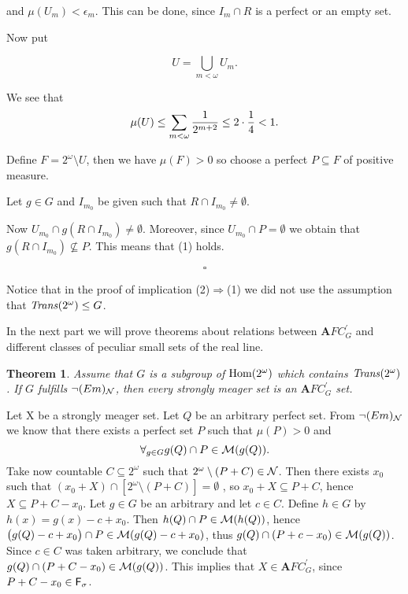\documentclass[b5cutpaper, twoside, 11pt, leqno]{moravica}
\newcommand{\eps}{\epsilon}
\newcommand{\afcp}{{\mathbf AFC}^\prime}
\newcommand\afcg{\afcp_{G}}
\newcommand\trans{{\it Trans}(\ca)}
\newcommand{\seq}{\subseteq}
\newcommand{\ca}{2^{\omega}}
\newcommand{\mgr}{{\cal M}}
\newcommand{\neglig}{{\cal N}}
\newcommand{\fsigma}{{\sf F}_{\sigma}}
\newcommand{\cantor}{\ca}
\newcommand\Hom{{\rm Hom(\ca)}}
\newtheorem{theorem}{Theorem}[section]
\theoremstyle{definition}
\begin{document}
and $\mu(U_{m}) < \eps_{m}$.
This can be done, since
$I_m \cap R$ is a perfect or an empty set.

Now put

\[ U = \bigcup_{m < \omega} U_m. \]

We see that
\[
\mu(U) \leq \sum_{m < \omega}
{1 \over 2^{m + 2}} \leq 2 \cdot {1 \over 4} < 1.
\]

Define $F = \cantor \setminus U$, then we have
$\mu(F) > 0$
so choose a perfect $P \seq F$ of positive
measure.

  Let $g \in G$ and $I_{m_0}$ be given such that
$R \cap I_{m_0} \not = \emptyset$.

Now $U_{m_0} \cap g(R \cap I_{m_0}) \not = \emptyset$.
Moreover, since
$U_{m_0} \cap P = \emptyset$
we obtain that $g(R \cap I_{m_0}) \not \seq P$.
This means that (1) holds.

  \[ \square \]

Notice that in the proof of implication (2)$\Rightarrow$(1)
we did not use the assumption that
$\trans \leq G$.

\bigskip

  In the next part we will prove theorems about relations between
$\afcg$ and different classes of peculiar small sets of the real line.

\begin{theorem}
\label{-em=>N}
  Assume that $G$ is a subgroup
of $\Hom$ which contains $\trans$.
  If $G$ fulfills $\neg (Em)_{\neglig}$,
then every strongly meager set is an $\afcg$ set.
\end{theorem}

\proof

Let X be a strongly meager set.
Let $Q$ be an arbitrary perfect set.
From $\neg (Em)_{\neglig}$ we know that there exists a perfect
set $P$ such that $\mu (P) > 0$ and
  \[ \forall_{g \in G} g(Q) \cap P \in \mgr(g(Q)). \]
Take now countable $C \seq \cantor $ such that
$\cantor \setminus (P + C) \in \neglig$.
  Then there exists $x_0$ such that $(x_0 +X) \cap
[ \cantor \setminus (P + C) ] = \emptyset $ ,
so $x_0 + X \seq P + C$, hence $X \seq P + C - x_0$.
  Let $g \in G$ be an arbitrary and let $c \in C$.
Define $h \in G$ by $h(x) = g(x) - c + x_0$.
  Then $h(Q) \cap P \in \mgr(h(Q))$, hence
$\big( g(Q) - c + x_0\big) \cap P \in \mgr(g(Q) - c + x_0)$,
thus $g(Q) \cap (P + c - x_0) \in \mgr(g(Q))$.
  Since $c \in C$ was taken arbitrary, we conclude that
$g(Q) \cap (P + C - x_0) \in \mgr(g(Q))$.
  This implies that $X \in \afcg$, since $P + C - x_0 \in \fsigma$.
\end{document}
